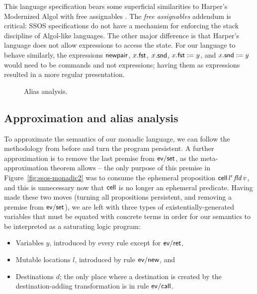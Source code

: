 This language specification bears some superficial similarities to
Harper's Modernized Algol with free assignables \cite[Chapter
36]{harper12practical}. The {\it free assignables} addendum is
critical: SSOS specifications do not have a mechanism for enforcing
the stack discipline of Algol-like languages. The other major
difference is that Harper's language does not allow expressions to
access the state.  For our language to behave similarly, the
expressions ${\sf newpair}$, $x.{\sf fst}$, $x.{\sf snd}$, $x.{\sf
  fst} := y$, and $x.{\sf snd} := y$ would need to be commands and not
expressions; having them as expressions resulted in a more regular
presentation.

\begin{figure}
\caption{Alias analysis.}
\label{fig:ssos-monadic-approx}
\end{figure}



\subsection{Approximation and alias analysis}


To approximate the semantics of our monadic language, we can follow the
methodology from before and turn the program persistent. A further
approximation is to remove the last premise from ${\sf ev/set}$, as
the meta-approximation theorem allows -- the only purpose of this
premise in Figure~\ref{fig:ssos-monadic2} was to consume the ephemeral
proposition ${\sf cell}\,l'\,{\it fld}\,v$, and this is unnecessary
now that ${\sf cell}$ is no longer an ephemeral predicate.  Having
made these two moves (turning all propositions persistent, and removing
a premise from ${\sf ev/set}$), we are left with three types of
existentially-generated variables that must be equated with concrete
terms in order for our semantics to be interpreted as a saturating
logic program:

\smallskip
\begin{itemize}
\item Variables $y$, introduced by every rule except for ${\sf ev/ret}$,
\item Mutable locations $l$, introduced by rule ${\sf ev/new}$, and 
\item Destinations $d$; the only place where a destination is created
by the destination-adding transformation is in rule ${\sf ev/call}$.
\end{itemize}
\smallskip

